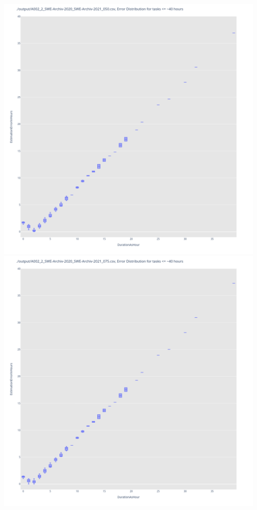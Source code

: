 \includegraphics[width=\textwidth]{Scripts/output/A002_2_SWE-Archiv-2020_SWE-Archiv-2021_050.csv.error_distribution.png}
\includegraphics[width=\textwidth]{Scripts/output/A002_2_SWE-Archiv-2020_SWE-Archiv-2021_075.csv.error_distribution.png}

